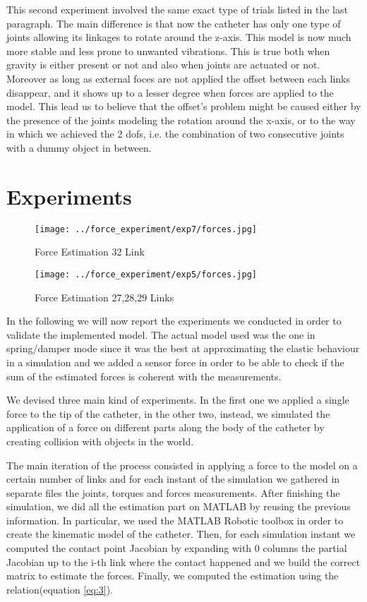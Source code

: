 \documentclass[conference,12pt]{IEEEtran}
\begin{document}
This second experiment involved the same exact type of trials listed in the last paragraph. The main difference is that now the catheter has only one type of joints allowing its linkages to rotate around the z-axis. This model is now much more stable and less prone to unwanted vibrations. This is true both when gravity is either present or not and also when joints are actuated or not. Moreover as long as external foces are not applied the offset between each links disappear, and it shows up to a lesser degree when forces are applied to the model. This lead us to believe that the offset’s problem might be caused either by the presence of the joints modeling the rotation around the x-axis, or to the way in which we achieved the 2 dofs, i.e. the combination of two consecutive joints with a dummy object in between.

\section{Experiments}

\begin{figure*}[t]
	\begin{minipage}{\columnwidth}
		\centering
		\texttt{[image: ../force\_experiment/exp7/forces.jpg]}
		\caption{Force Estimation 32 Link}
		\label{f_32}
	\end{minipage}%
	\begin{minipage}{\columnwidth}
		\centering
		\texttt{[image: ../force\_experiment/exp5/forces.jpg]}
		\caption{Force Estimation 27,28,29 Links}
		\label{f_3_link}
	\end{minipage}
\end{figure*}

In the following we will now report the experiments we conducted in order to validate the implemented model. The actual model used was the one in spring/damper mode since it was the best at approximating the elastic behaviour in a simulation and we added a sensor force in order to be able to check if the sum of the estimated forces is coherent with the measurements.

We devised three main kind of experiments. In the first one we applied a single force to the tip of the catheter, in the other two, instead, we simulated the application of a force on different parts along the body of the catheter by creating collision with objects in the world.

The main iteration of the process consisted in applying a force to the model on a certain number of links and for each instant of the simulation we gathered in separate files the joints, torques and forces measurements. After finishing the simulation, we did all the estimation part on MATLAB by reusing the previous information. In particular, we used the MATLAB Robotic toolbox in order to create the kinematic model of the catheter. Then, for each simulation instant we computed the contact point Jacobian by expanding with 0 columns the partial Jacobian up to the i-th link where the contact happened and we build the correct matrix to estimate the forces. Finally, we computed the estimation using the relation(equation \ref{eq:3}).
\end{document}
